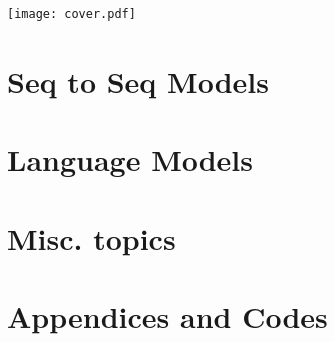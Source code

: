 \documentclass[
	11pt, %
	fleqn, %
	a4paper, %
]{LegrandOrangeBook}
\begin{document}
\setlength{\parindent}{0pt}



\titlepage %
	{\texttt{[image: cover.pdf]}} 










\pagestyle{empty} %

\tableofcontents %









\part{Seq to Seq Models}






\part{Language Models}





\part{Misc. topics}




\part{Appendices and Codes}


\end{document}
